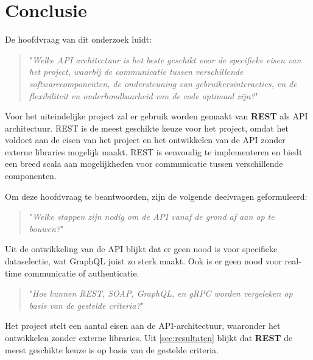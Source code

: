 \section{Conclusie}
\label{sec:conclusie}

De hoofdvraag van dit onderzoek luidt:

\begin{quote}
  "\textit{Welke API architectuur is het beste geschikt voor de specifieke eisen van het project, waarbij de communicatie tussen verschillende softwarecomponenten, de ondersteuning van gebruikersinteracties, en de flexibiliteit en onderhoudbaarheid van de code optimaal zijn?}"
\end{quote}

Voor het uiteindelijke project zal er gebruik worden gemaakt van \textbf{REST}
als API architectuur. REST is de meest geschikte keuze voor het project, omdat
het voldoet aan de eisen van het project en het ontwikkelen van de API zonder
externe libraries mogelijk maakt. REST is eenvoudig te implementeren en biedt
een breed scala aan mogelijkheden voor communicatie tussen verschillende
componenten.

Om deze hoofdvraag te beantwoorden, zijn de volgende deelvragen geformuleerd:

\begin{quote}
  "\textit{Welke stappen zijn nodig om de API vanaf de grond af aan op te bouwen?}"
\end{quote}

Uit de ontwikkeling van de API blijkt dat er geen nood is voor specifieke
dataselectie, wat GraphQL juist zo sterk maakt. Ook is er geen nood voor
real-time communicatie of authenticatie.

\begin{quote}
  "\textit{Hoe kunnen REST, SOAP, GraphQL, en gRPC worden vergeleken op basis van de gestelde criteria?}"
\end{quote}

Het project stelt een aantal eisen aan de API-architectuur, waaronder het
ontwikkelen zonder externe libraries. Uit \autoref{sec:resultaten} blijkt dat
\textbf{REST} de meest geschikte keuze is op basis van de gestelde criteria.
